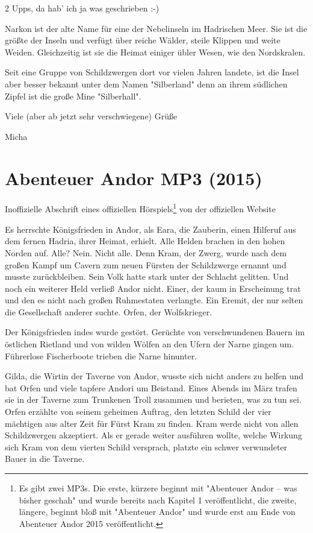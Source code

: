 \documentclass[10pt, a4paper, oneside]{book}
\newcommand{\storytext}[2][]{%
        \section{#2}%
        \label{storytext-#1}%
    }
\newcommand{\fillbreak}{\vspace*{\fill}\columnbreak}
\begin{document}
\begin{multicols}{2}
Upps, da hab' ich ja was geschrieben :-)

Narkon ist der alte Name für eine der Nebelinseln im Hadrischen Meer. Sie ist die größte der Inseln und verfügt über reiche Wälder, steile Klippen und weite Weiden. Gleichzeitig ist sie die Heimat einiger übler Wesen, wie den Nordskralen.

Seit eine Gruppe von Schildzwergen dort vor vielen Jahren landete, ist die Insel aber besser bekannt unter dem Namen "Silberland" denn an ihrem südlichen Zipfel ist die große Mine "Silberhall".


Viele (aber ab jetzt sehr verschwiegene) Grüße

Micha



\fillbreak
\storytext[2015-abenteuer-andor-mp3]{Abenteuer Andor MP3 (2015)}

\begin{center}
    Inoffizielle Abschrift eines offiziellen Hörspiels\footnote{Es gibt zwei MP3s. Die erste, kürzere beginnt mit "Abenteuer Andor – was bisher geschah" und wurde bereits nach Kapitel 1 veröffentlicht, die zweite, längere, beginnt bloß mit "Abenteuer Andor" und wurde erst am Ende von Abenteuer Andor 2015 veröffentlicht.} von der offiziellen Website
\end{center}

Es herrschte Königsfrieden in Andor, als Eara, die Zauberin, einen Hilferuf aus dem fernen Hadria, ihrer Heimat, erhielt. Alle Helden brachen in den hohen Norden auf. Alle? Nein. Nicht alle. Denn Kram, der Zwerg, wurde nach dem großen Kampf um Cavern zum neuen Fürsten der Schildzwerge ernannt und musste zurückbleiben. Sein Volk hatte stark unter der Schlacht gelitten. Und noch ein weiterer Held verließ Andor nicht. Einer, der kaum in Erscheinung trat und den es nicht nach großen Ruhmestaten verlangte. Ein Eremit, der nur selten die Gesellschaft anderer suchte. Orfen, der Wolfskrieger.

Der Königsfrieden indes wurde gestört. Gerüchte von verschwundenen Bauern im östlichen Rietland und von wilden Wölfen an den Ufern der Narne gingen um. Führerlose Fischerboote trieben die Narne hinunter.

Gilda, die Wirtin der Taverne von Andor, wusste sich nicht anders zu helfen und bat Orfen und viele tapfere Andori um Beistand. Eines Abends im März trafen sie in der Taverne zum Trunkenen Troll zusammen und berieten, was zu tun sei. Orfen erzählte von seinem geheimen Auftrag, den letzten Schild der vier mächtigen aus alter Zeit für Fürst Kram zu finden. Kram werde nicht von allen Schildzwergen akzeptiert. Als er gerade weiter ausführen wollte, welche Wirkung sich Kram von dem vierten Schild versprach, platzte ein schwer verwundeter Bauer in die Taverne. 


\end{multicols}
\end{document}
